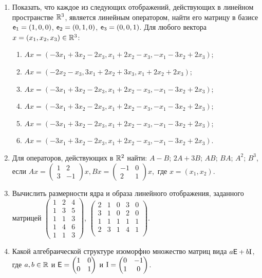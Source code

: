 \begin{enumerate}
\item Показать, что каждое из следующих отображений, действующих в линейном пространстве $\mathbb R^3$,
является линейным оператором, найти его матрицу в базисе $\mathsf e_1 = (1,0,0)$, $\mathsf e_2 = (0, 1, 0)$, $\mathsf e_3 = (0, 0, 1)$. Для любого вектора $x = (x_1, x_2, x_3) \in \mathbb R^3$:
\begin{enumerate}
\item $Ax = (-3x_1 + 3x_2 - 2x_3, x_1 + 2x_2 - x_3 , -x_1 - 3x_2 + 2x_3)$;
\item $Ax = (-2x_2 - x_3 , 3x_1 + 2x_2 + 3x_3 , x_1 + 2x_2 + 2x_3)$;
\item $Ax = (-3x_1 + 3x_2 - 2x_3 , x_1 + 2x_2 - x_3 , -x_1 - 3x_2 + 2x_3 )$;
\item $Ax = (-3x_1 + 3x_2 - 2x_3 , x_1 + 2x_2 - x_3 , -x_1 - 3x_2 + 2x_3 )$;
\item $Ax = (-3x_1 + 3x_2 - 2x_3 , x_1 + 2x_2 - x_3 , -x_1 - 3x_2 + 2x_3 )$;
\item $Ax = (-3x_1 + 3x_2 - 2x_3 , x_1 + 2x_2 - x_3 , -x_1 - 3x_2 + 2x_3 )$.
\end{enumerate}

\item Для операторов, действующих в $\mathbb R^2$ найти:
\ipunkt $A-B$; \ipunkt $2A+3B$;  \ipunkt $AB$; \ipunkt $BA$; \ipunkt $A^2$; \ipunkt $B^3$, если
$
Ax = \begin{pmatrix} 1 & 2 \\ 3 & -1 \end{pmatrix}x,
Bx = \begin{pmatrix} -1 & 0 \\ 2 & 1 \end{pmatrix}x,
$
где $x = (x_1, x_2)$.

\item Вычислить размерности ядра и образа линейного отображения, заданного матрицей
\ipunkt
$\begin{pmatrix} 1 & 2 & 4 \\[-5pt]
1 & 3 & 5 \\[-5pt]
1 & 1 & 3 \\[-5pt]
1 & 4 & 6 \\[-5pt]
1 & 1 & 3 
\end{pmatrix}$,
\ipunkt
$\begin{pmatrix} 2 & 1 & 0 & 3 & 0 \\
3 & 1 & 0 & 2 & 0 \\
1 & 1 & 1 & 1 & 1 \\
2 & 3 & 1 & 4 & 1 \\
\end{pmatrix}$.

\item Какой алгебраической структуре изоморфно множество матриц вида $a\mathsf{E}+b\mathrm{I}$, где $a,b\in\mathbb R$ и 
$\mathsf{E}=\begin{pmatrix}1&0\\0&1\end{pmatrix}$ и $\mathrm{I}=\begin{pmatrix}0&-1\\1&0\end{pmatrix}$.
\end{enumerate}



